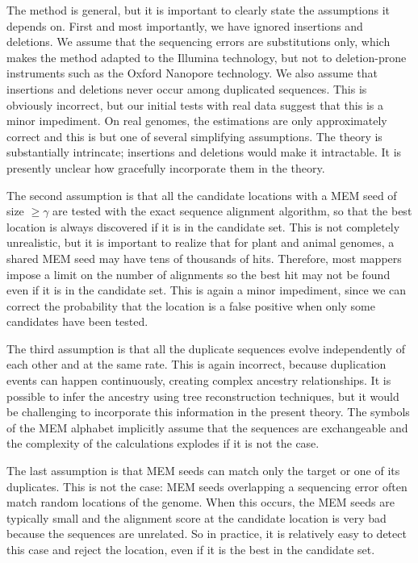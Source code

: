 \documentclass{article}
\begin{document}
The method is general, but it is important to clearly state the
assumptions it depends on. First and most importantly, we have ignored
insertions and deletions. We assume that the sequencing errors are
substitutions only, which makes the method adapted to the Illumina
technology, but not to deletion-prone instruments such as the Oxford
Nanopore technology. We also assume that insertions and deletions never
occur among duplicated sequences. This is obviously incorrect, but our
initial tests with real data suggest that this is a minor impediment. On
real genomes, the estimations are only approximately correct and this is
but one of several simplifying assumptions. The theory is substantially
intrincate; insertions and deletions would make it intractable.
It is presently unclear how gracefully incorporate them in the theory.

The second assumption is that all the candidate locations with a MEM
seed of size $\geq \gamma$ are tested with the exact sequence alignment
algorithm, so that the best location is always discovered if it is in the
candidate set. This is not completely unrealistic, but it is important to
realize that for plant and animal genomes, a shared MEM seed may have tens
of thousands of hits. Therefore, most mappers impose a limit on the number
of alignments so the best hit may not be found even if it is in the
candidate set. This is again a minor impediment, since we can correct the
probability that the location is a false positive when only some
candidates have been tested.

The third assumption is that all the duplicate sequences evolve
independently of each other and at the same rate. This is again incorrect,
because duplication events can happen continuously, creating complex
ancestry relationships. It is possible to infer the ancestry using tree
reconstruction techniques, but it would be challenging to incorporate this
information in the present theory. The symbols of the MEM alphabet
implicitly assume that the sequences are exchangeable and the complexity
of the calculations explodes if it is not the case.

The last assumption is that MEM seeds can match only the target or one of
its duplicates. This is not the case: MEM seeds overlapping a sequencing
error often match random locations of the genome. When this occurs, the
MEM seeds are typically small and the alignment score at the candidate
location is very bad because the sequences are unrelated. So in practice,
it is relatively easy to detect this case and reject the location, even if
it is the best in the candidate set.
\end{document}
